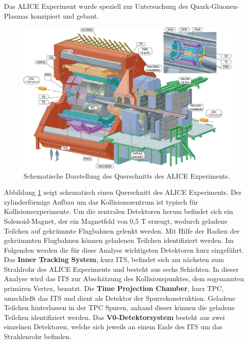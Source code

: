 Das ALICE Experiment wurde speziell zur Untersuchung des Quark-Gluonen-Plasmas konzipiert und gebaut.
\begin{figure}[tp]
\centering
\includegraphics[width=.9\linewidth]{ALICE.jpg}
\caption{Schematische Darstellung des Querschnitts des ALICE Experiments.
\cite{WEBSITE:1}}
\label{fig:ALICE}
\end{figure}
Abbildung \ref{fig:ALICE} zeigt schematisch einen Querschnitt des ALICE Experiments. Der zylinderförmige Aufbau um das Kollisionszentrum ist typisch für Kollisionsexperimente.
\newline
Um die zentralen Detektoren herum befindet sich ein Solenoid-Magnet, der ein Magnetfeld von 0,5 T erzeugt, wodurch geladene Teilchen auf gekrümmte Flugbahnen gelenkt werden.
Mit Hilfe der Radien der gekrümmten Flugbahnen können geladenen Teilchen identifiziert werden.
Im Folgenden werden die für diese Analyse wichtigsten Detektoren kurz eingeführt.
\newline
Das \textbf{Inner Tracking System}, kurz ITS, befindet sich am nächsten zum Strahlrohr des ALICE Experiments und besteht aus sechs Schichten.
In dieser Analyse wird das ITS zur Abschätzung des Kollisionspunktes, dem sogenannten primären Vertex, benutzt.
\newline
Die \textbf{Time Projection Chamber}, kurz TPC, umschließt das ITS und dient als Detektor der Spurrekonstruktion.
Geladene Teilchen hinterlassen in der TPC Spuren, anhand dieser können die geladene Teilchen identifiziert werden.
\newline
Das \textbf{V0-Detektorsystem} besteht aus zwei einzelnen Detektoren, welche sich jeweils an einem Ende des ITS um das Strahlenrohr befinden.
